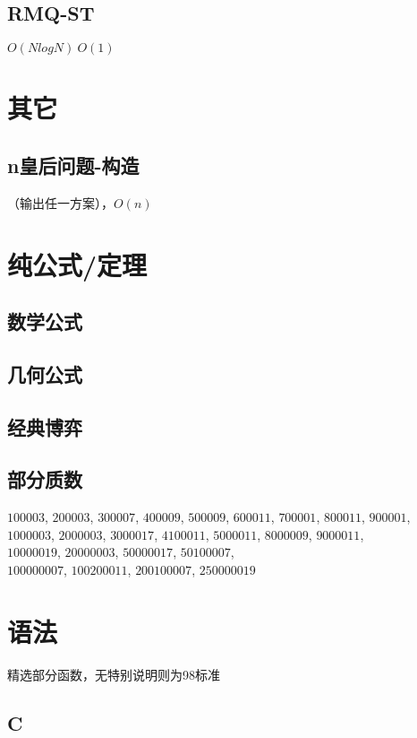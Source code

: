 \documentclass[10pt]{article}
\begin{document}
\subsection{RMQ-ST}
$O(NlogN)~O(1)$

\section{其它}
\subsection{n皇后问题-构造}
（输出任一方案），$O(n)$

\section{纯公式/定理}
\subsection{数学公式}


\subsection{几何公式}


\subsection{经典博弈}


\subsection{部分质数}
\noindent
$100003$, $200003$, $300007$, $400009$, $500009$, $600011$, $700001$, $800011$, $900001$, \\
$1000003$, $2000003$, $3000017$, $4100011$, $5000011$, $8000009$, $9000011$, \\
$10000019$, $20000003$, $50000017$, $50100007$, \\
$100000007$, $100200011$, $200100007$, $250000019$
\section{语法}
精选部分函数，无特别说明则为98标准
\subsection{C}
\end{document}
